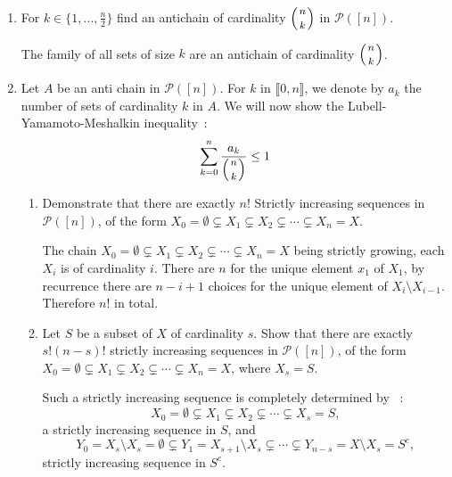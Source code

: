 \documentclass[a4paper,11pt]{exam}
\renewcommand{\binom}{\mbinom}
\begin{document}
\begin{questions}
\begin{enumerate}
    \item For $k \in\{1,...,\frac{n}{2}\}$ find an antichain of cardinality $\binom{n}{k}$ in $ \mathcal{P}([n])$.

      \begin{solution}
       The family of all sets of size $k$ are an antichain of cardinality
        $\binom{n}{k}$.
      \end{solution}

    \item Let $A$ be an anti chain in $ \mathcal{P}([n])$. For $k$ in $\llbracket 0,n\rrbracket$, we denote by $ a_k $ the number of sets of cardinality $k$ in $ A $.
      We will now show the Lubell-Yamamoto-Meshalkin inequality~:
      \[
        \sum_{k=0}^n \frac{a_k}{\binom{n}{k}} \leq 1
      \]

      \begin{enumerate}
        \item Demonstrate that there are exactly $ n! $ Strictly increasing sequences in $ \mathcal{P}([n])$, of the form $X_0 = \emptyset \subsetneq X_1
          \subsetneq X_2 \subsetneq \cdots \subsetneq X_n=X$.
           
          \begin{solution}
            The chain $X_0 = \emptyset \subsetneq X_1 \subsetneq X_2 \subsetneq
            \cdots \subsetneq X_n=X$ being strictly growing, each $X_i$
            is of cardinality $i$. 
            There are $n$ for the unique element $x_1$ of $X_1$, by recurrence there  are $n-i+1$ choices for the unique  element of $X_i \setminus
            X_{i-1}$.
            Therefore $n!$ in total.
          \end{solution}

        \item Let $ S $ be a subset of $ X $ of cardinality $ s $. Show that there are exactly $ s! (n-s)!$ strictly increasing sequences in $ \mathcal{P}([n])$, of the form $X_0 = \emptyset \subsetneq X_1 \subsetneq X_2
          \subsetneq \cdots \subsetneq X_n=X$, where $X_s = S$.

          \begin{solution}
            Such a strictly increasing sequence is completely determined by ~:
            $$X_0 = \emptyset \subsetneq X_1 \subsetneq X_2 \subsetneq
            \cdots \subsetneq X_s=S,$$
            a strictly increasing sequence in $S$, and 
            $$Y_0 = X_s \setminus X_s = \emptyset \subsetneq Y_1 =
            X_{s+1} \setminus X_s \subsetneq \cdots \subsetneq Y_{n-s} =
            X \setminus X_s = S^c,$$
            strictly increasing sequence in $S^c$.


\end{solution}
\end{enumerate}
\end{enumerate}
\end{questions}
\end{document}
